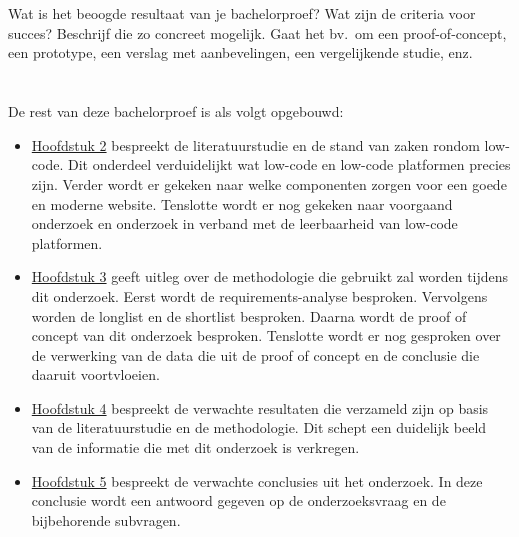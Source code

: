 \section{}%
\label{sec:onderzoeksdoelstelling}

Wat is het beoogde resultaat van je bachelorproef? Wat zijn de criteria voor succes? Beschrijf die zo concreet mogelijk. Gaat het bv.\ om een proof-of-concept, een prototype, een verslag met aanbevelingen, een vergelijkende studie, enz.

\section{}%
\label{sec:opzet-bachelorproef}


De rest van deze bachelorproef is als volgt opgebouwd:

\begin{itemize}
  \item \hyperref[sec:literatuurstudie]{Hoofdstuk 2} bespreekt de literatuurstudie en de stand van zaken rondom low-code. Dit onderdeel verduidelijkt wat low-code en low-code platformen precies zijn. Verder wordt er gekeken naar welke componenten zorgen voor een goede en moderne website. Tenslotte wordt er nog gekeken naar voorgaand onderzoek en onderzoek in verband met de leerbaarheid van low-code platformen.
  \item \hyperref[sec:methodologie]{Hoofdstuk 3} geeft uitleg over de methodologie die gebruikt zal worden tijdens dit onderzoek. Eerst wordt de requirements-analyse besproken. Vervolgens worden de longlist en de shortlist besproken. Daarna wordt de proof of concept van dit onderzoek besproken. Tenslotte wordt er nog gesproken over de verwerking van de data die uit de proof of concept en de conclusie die daaruit voortvloeien.
  \item \hyperref[sec:Verwachte resultaten]{Hoofdstuk 4} bespreekt de verwachte resultaten die verzameld zijn op basis van de literatuurstudie en de methodologie. Dit schept een duidelijk beeld van de informatie die met dit onderzoek is verkregen. 
  \item \hyperref[sec:discussie-conclusie]{Hoofdstuk 5} bespreekt de verwachte conclusies uit het onderzoek. In deze conclusie wordt een antwoord gegeven op de onderzoeksvraag en de bijbehorende subvragen.
\end{itemize}